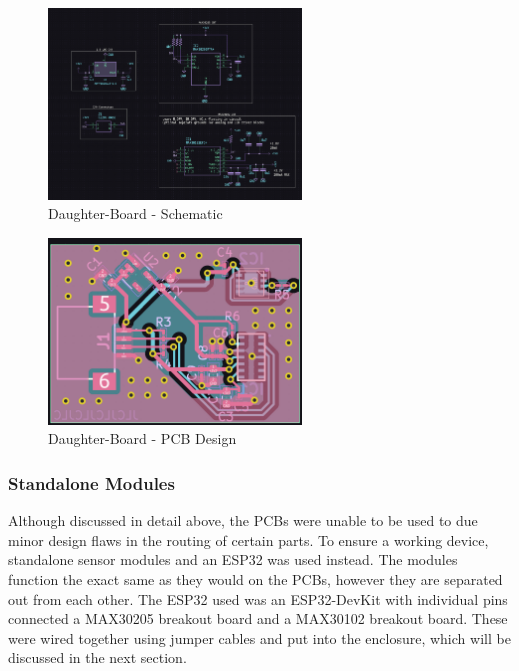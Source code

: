 \documentclass[12pt]{article}
\begin{document}
    \begin{figure}[hbt!]
        \centering
        \includegraphics[width=0.6\textwidth]{images/mb_schematic.png}
        \caption{Daughter-Board - Schematic}
        \label{db_schem}
    \end{figure}

    \begin{figure}[hbt!]
        \centering
        \includegraphics[width=0.6\textwidth]{images/mb_board.png}
        \caption{Daughter-Board - PCB Design}
        \label{db_board}
    \end{figure}

\subsubsection{Standalone Modules}
    Although discussed in detail above, the PCBs were unable to be used to due minor design flaws in the routing of certain parts. To ensure a working device, standalone sensor modules and an ESP32 was used instead. The modules function the exact same as they would on the PCBs, however they are separated out from each other. The ESP32 used was an ESP32-DevKit with individual pins connected a MAX30205 breakout board and a MAX30102 breakout board. These were wired together using jumper cables and put into the enclosure, which will be discussed in the next section.
\end{document}
